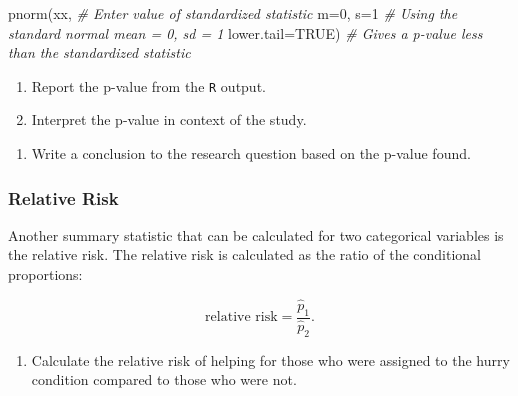 \documentclass[
]{report}
\newenvironment{Shaded}{\begin{snugshade}}{\end{snugshade}}
\newcommand{\AttributeTok}[1]{\textcolor[rgb]{0.77,0.63,0.00}{#1}}
\newcommand{\CommentTok}[1]{\textcolor[rgb]{0.56,0.35,0.01}{\textit{#1}}}
\newcommand{\ConstantTok}[1]{\textcolor[rgb]{0.00,0.00,0.00}{#1}}
\newcommand{\DecValTok}[1]{\textcolor[rgb]{0.00,0.00,0.81}{#1}}
\newcommand{\FunctionTok}[1]{\textcolor[rgb]{0.00,0.00,0.00}{#1}}
\newcommand{\NormalTok}[1]{#1}
\providecommand{\tightlist}{%
  \setlength{\itemsep}{0pt}\setlength{\parskip}{0pt}}
\begin{document}
\begin{Shaded}
\begin{Highlighting}[]
\FunctionTok{pnorm}\NormalTok{(xx, }\CommentTok{\# Enter value of standardized statistic}
      \AttributeTok{m=}\DecValTok{0}\NormalTok{, }\AttributeTok{s=}\DecValTok{1} \CommentTok{\# Using the standard normal mean = 0, sd = 1}
      \AttributeTok{lower.tail=}\ConstantTok{TRUE}\NormalTok{) }\CommentTok{\# Gives a p{-}value less than the standardized statistic}
\end{Highlighting}
\end{Shaded}

\begin{enumerate}
\def\labelenumi{\arabic{enumi}.}
\setcounter{enumi}{7}
\item
  Report the p-value from the \texttt{R} output.
  \vspace{0.2in}
\item
  Interpret the p-value in context of the study.
\end{enumerate}

\vspace{0.5in}

\begin{enumerate}
\def\labelenumi{\arabic{enumi}.}
\setcounter{enumi}{9}
\tightlist
\item
  Write a conclusion to the research question based on the p-value found.
\end{enumerate}

\vspace{1in}

\hypertarget{relative-risk}{%
\subsubsection{Relative Risk}\label{relative-risk}}

Another summary statistic that can be calculated for two categorical variables is the relative risk. The relative risk is calculated as the ratio of the conditional proportions:

\[\text{relative risk} = \frac{\hat{p}_1}{\hat{p}_2}.\]

\begin{enumerate}
\def\labelenumi{\arabic{enumi}.}
\setcounter{enumi}{10}
\tightlist
\item
  Calculate the relative risk of helping for those who were assigned to the hurry condition compared to those who were not.
\end{enumerate}
\end{document}

